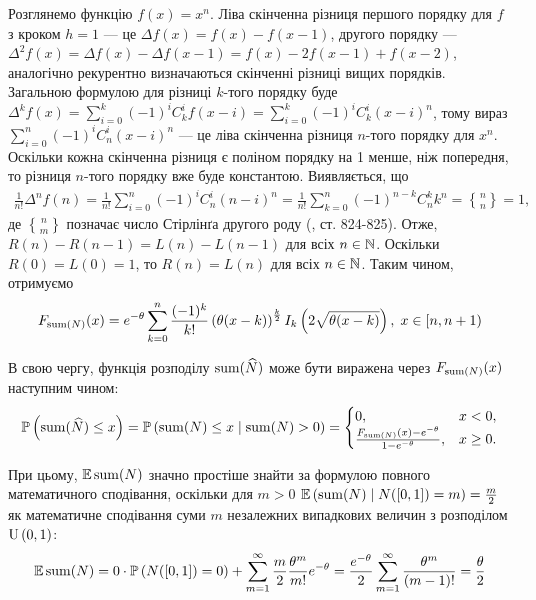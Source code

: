 Розглянемо функцію $f(x) = x^n$.
Ліва скінченна різниця першого порядку для $f$ з кроком $h=1$ --- це 
$\Delta f(x) = f(x) - f(x-1)$, другого порядку --- $\Delta^2 f(x) = \Delta f(x) - \Delta f(x-1) = 
f(x) - 2f(x-1) + f(x-2)$,
аналогічно рекурентно визначаються скінченні різниці вищих порядків.
Загальною формулою для різниці $k$-того порядку буде
$\Delta^k f(x) = \sum_{i=0}^k (-1)^i C_k^i f(x-i) = \sum_{i=0}^k (-1)^i C_k^i (x - i)^n$,
тому вираз $\sum_{i=0}^n (-1)^i C_n^i (x-i)^n$ --- це ліва скінченна різниця $n$-того порядку для
$x^n$. Оскільки кожна скінченна різниця є поліном порядку на 1 менше, ніж попередня,
то різниця $n$-того порядку вже буде константою. Виявляється,
що
\begin{gather*}
    \frac{1}{n!} \Delta^n f(n) = 
    \frac{1}{n!} \sum_{i=0}^n (-1)^i C_n^i (n - i)^n = 
    \frac{1}{n!} \sum_{k=0}^n (-1)^{n-k} C_n^k k^n = {n\brace n} = 1,
\end{gather*}
де ${n \brace m}$ позначає число Стірлінґа другого роду (\cite{Abramowitz_Stegun}, ст. 824-825).
Отже, $R(n) - R(n-1) = L(n) - L(n-1)$ для всіх $n \in \mathbb{N}$. Оскільки
$R(0) = L(0) = 1$, то $R(n) = L(n)$ для всіх $n \in \mathbb{N}$.
Таким чином, отримуємо 
\begin{gather}
    F_{\operatorname{sum}(N)}(x) = e^{-\theta}
    \sum_{k=0}^{n} \frac{(-1)^k}{k!}
    \left(\theta (x - k)\right)^{\frac{k}{2}} I_k\left(2\sqrt{\theta(x-k)}\right), \; x \in [n, n+1)
\end{gather}

В свою чергу, функція розподілу $\operatorname{sum}(\widehat{N})$ 
може бути виражена через $F_{\operatorname{sum}(N)}(x)$ наступним чином:
\begin{gather}
    \mathbb{P}\left(\operatorname{sum}(\widehat{N}) \leq x\right) = \mathbb{P}\left(\operatorname{sum}(N) \leq x \mid \operatorname{sum}(N) > 0\right) = 
    \begin{cases}
        0, & x < 0, \\
        \frac{F_{\operatorname{sum}(N)}(x) - e^{-\theta}}{1-e^{-\theta}}, & x \geq 0.
    \end{cases}
\end{gather}

При цьому, $\mathbb{E}\operatorname{sum}(N)$ значно простіше знайти
за формулою повного математичного сподівання,
оскільки для $m > 0$ $\mathbb{E}\left(\operatorname{sum}(N) \mid N([0, 1]) = m\right) = \frac{m}{2}$
як математичне сподівання суми $m$ незалежних випадкових величин
з розподілом $\mathrm{U}\left(0, 1\right)$:
\begin{gather*}
    \mathbb{E}\operatorname{sum}(N) = 0\cdot \mathbb{P}\left(N([0, 1]) = 0\right) +
    \sum_{m=1}^{\infty} \frac{m}{2} \frac{\theta^m}{m!} e^{-\theta} =
    \frac{e^{-\theta}}{2}\sum_{m=1}^{\infty} \frac{\theta^m}{(m-1)!} = \frac{\theta}{2}
\end{gather*}

